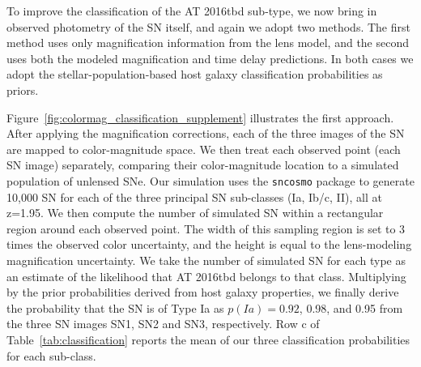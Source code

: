 \documentclass[12pt]{article}
\def\SNABC{AT 2016tbd\xspace}
\begin{document}
To improve the classification of the \SNABC sub-type, we now bring in observed photometry of the SN itself, and again we adopt two methods.  The first method uses only magnification information from the lens model, and the second uses both the modeled magnification and time delay predictions.  In both cases we adopt the stellar-population-based host galaxy classification probabilities as priors.

Figure~\ref{fig:colormag_classification_supplement} illustrates the first approach.  After applying the magnification corrections, each of the three images of the SN are mapped to color-magnitude space.  We then treat each observed point (each SN image) separately, comparing their color-magnitude location to a simulated population of unlensed SNe.  Our simulation uses the {\tt sncosmo} package \cite{barbary_sncosmo_2016}  to generate 10,000 SN for each of the three principal SN sub-classes (Ia, Ib/c, II), all at z=1.95.  
We then compute the number of simulated SN within a rectangular region around each observed point. The width of this sampling region is set to 3 times the observed color uncertainty, and the height is equal to the lens-modeling magnification uncertainty.   We take the number of simulated SN for each type as an estimate of the likelihood that \SNABC belongs to that class.   Multiplying by the prior probabilities derived from host galaxy properties, we finally derive the probability that the SN is of Type Ia as $p(Ia)=0.92$, 0.98, and 0.95 from the three SN images SN1, SN2 and SN3, respectively. Row c of Table~\ref{tab:classification} reports the mean of our three classification probabilities for each sub-class. 
\end{document}
